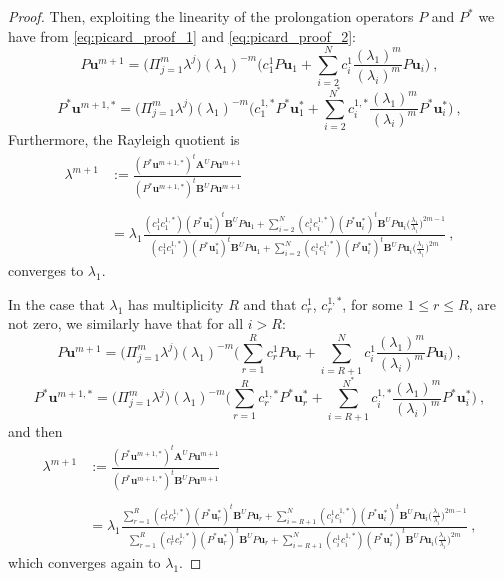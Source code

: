 \documentclass[smallextended]{svjour3}
\begin{document}
\begin{proof}
Then, exploiting the linearity of the prolongation operators $P$ and $P^*$ we have from \eqref{eq:picard_proof_1} and \eqref{eq:picard_proof_2}:
$$
P\mathbf{u}^{m+1}=\Big(\Pi_{j=1}^m\lambda^{j}\Big)(\lambda_1)^{-m}\Big( c_1^1 P\mathbf{u}_1 +
\sum_{i=2}^N c_i^1\frac{(\lambda_1)^m}{(\lambda_i)^{m}}P\mathbf{u}_i\Big) \ ,
$$
$$
P^*\mathbf{u}^{m+1,*}=\Big(\Pi_{j=1}^m\lambda^{j}\Big)(\lambda_1)^{-m}\Big( c_1^{1,*} P^*\mathbf{u}_1^* +
\sum_{i=2}^{N^*} c_i^{1,*}\frac{(\lambda_1)^m}{(\lambda_i)^{m}}P^*\mathbf{u}_i^*\Big) \ ,
$$
Furthermore, the Rayleigh quotient is
$$
\begin{array}{ll}
\displaystyle\lambda^{m+1}&\displaystyle:=\frac{(P^*\mathbf{u}^{m+1,*})^t\mathbf{A}^U P\mathbf{u}^{m+1}}{(P^*\mathbf{u}^{m+1,*})^t\mathbf{B}^U P\mathbf{u}^{m+1}}\\
\\
&=\lambda_1 \frac{\displaystyle(c_1^1c_1^{1,*})(P^*\mathbf{u}^{*}_1)^t\mathbf{B}^U P\mathbf{u}_1 +
\sum_{i=2}^N (c_i^1c_i^{1,*})(P^*\mathbf{u}^{*}_i)^t\mathbf{B}^U P\mathbf{u}_i\Bigg(\frac{\lambda_1}{\lambda_i}\Bigg)^{2m-1}}
{\displaystyle(c_1^1c_1^{1,*})(P^*\mathbf{u}^{*}_1)^t\mathbf{B}^U P\mathbf{u}_1 +
\sum_{i=2}^N (c_i^1c_i^{1,*})(P^*\mathbf{u}^{*}_i)^t\mathbf{B}^U P\mathbf{u}_i\Bigg(\frac{\lambda_1}{\lambda_i}\Bigg)^{2m}}\ ,
\end{array}
$$
converges to $\lambda_1$.

In the case that $\lambda_1$ has multiplicity $R$ and that $c_r^1$, $c_r^{1,*}$, for some $1\leq r\leq R$, are not zero,
we similarly have that for all $i>R$:
$$
P\mathbf{u}^{m+1}=\Big(\Pi_{j=1}^m\lambda^{j}\Big)(\lambda_1)^{-m}\Big( \sum_{r=1}^Rc_r^1 P\mathbf{u}_r+
\sum_{i=R+1}^N c_i^1\frac{(\lambda_1)^m}{(\lambda_i)^{m}}P\mathbf{u}_i\Big) \ ,
$$
$$
P^*\mathbf{u}^{m+1,*}=\Big(\Pi_{j=1}^m\lambda^{j}\Big)(\lambda_1)^{-m}\Big( \sum_{r=1}^Rc_r^{1,*} P^*\mathbf{u}_r^*+
\sum_{i=R+1}^{N^*} c_i^{1,*}\frac{(\lambda_1)^m}{(\lambda_i)^{m}}P^*\mathbf{u}_i^*\Big) \ ,
$$
and then
$$
\begin{array}{ll}
\displaystyle\lambda^{m+1}&\displaystyle:=\frac{(P^*\mathbf{u}^{m+1,*})^t\mathbf{A}^U P\mathbf{u}^{m+1}}{(P^*\mathbf{u}^{m+1,*})^t\mathbf{B}^U P\mathbf{u}^{m+1}}\\
\\
&\displaystyle=\lambda_1 \frac{\displaystyle \sum_{r=1}^R(c_r^1c_r^{1,*})(P^*\mathbf{u}^{*}_r)^t\mathbf{B}^U P\mathbf{u}_r +
\sum_{i=R+1}^N (c_i^1c_i^{1,*})(P^*\mathbf{u}^{*}_i)^t\mathbf{B}^U P\mathbf{u}_i\Bigg(\frac{\lambda_1}{\lambda_i}\Bigg)^{2m-1}}
{\displaystyle \sum_{r=1}^R(c_r^1c_r^{1,*})(P^*\mathbf{u}^{*}_r)^t\mathbf{B}^U P\mathbf{u}_r +
\sum_{i=R+1}^N (c_i^1c_i^{1,*})(P^*\mathbf{u}^{*}_i)^t\mathbf{B}^U P\mathbf{u}_i\Bigg(\frac{\lambda_1}{\lambda_i}\Bigg)^{2m}}\ ,
\end{array}
$$
which converges again to $\lambda_1$.


\end{proof}
\end{document}
